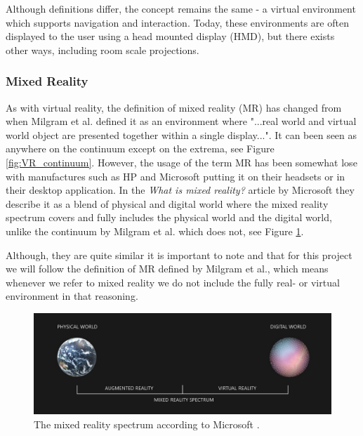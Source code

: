 Although definitions differ, the concept remains the same - a virtual environment which supports navigation and interaction. Today, these environments are often displayed to the user using a head mounted display (HMD), but there exists other ways, including room scale projections.

\subsubsection{Mixed Reality} \label{background:MixedReality}
As with virtual reality, the definition of mixed reality (MR) has changed from when Milgram et al. defined it  \cite{milgram1995augmented} as an environment where "...real world and virtual world object are presented together within a single display...". It can been seen as anywhere on the continuum except on the extrema, see Figure \ref{fig:VR_continuum}. However, the usage of the term MR has been somewhat lose with manufactures such as HP and Microsoft putting it on their headsets or in their desktop application. In the \textit{What is mixed reality?} \cite{microsoftMR} article by Microsoft they describe it as a blend of physical and digital world where the mixed reality spectrum covers and fully includes the physical world and the digital world, unlike the continuum by Milgram et al. which does not, see Figure \ref{fig:MicrosoftSpectrum}.

Although, they are quite similar it is important to note and that for this project we will follow the definition of MR defined by Milgram et al., which means whenever we refer to mixed reality we do not include the fully real- or virtual environment in that reasoning.  

\begin{figure}
    \centering
    \includegraphics[width=\textwidth]{./fig/background/microsoft_spectrum.jpg}
    \caption{The mixed reality spectrum according to Microsoft \cite{microsoftMR}.}
    \label{fig:MicrosoftSpectrum}
\end{figure}


